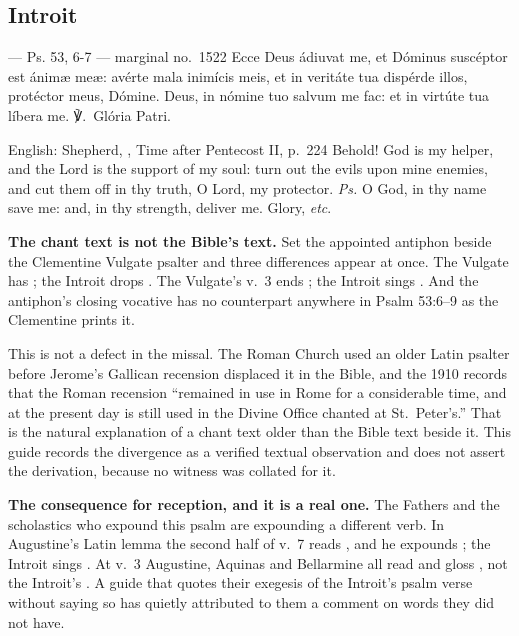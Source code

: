 \subsection*{Introit }

\begin{appointedlatin}{ --- Ps. 53, 6-7 --- marginal no.\ 1522}
Ecce Deus ádiuvat me, et Dóminus suscéptor est ánimæ meæ: avérte mala inimícis
meis, et in veritáte tua dispérde illos, protéctor meus, Dómine.  Deus, in nómine tuo salvum me fac: et in virtúte tua líbera me.
℣.~Glória Patri.
\end{appointedlatin}

\begin{namedtranslation}{English: Shepherd, , Time after Pentecost II, p.~224}
Behold! God is my helper, and the Lord is the support of my soul: turn out the
evils upon mine enemies, and cut them off in thy truth, O Lord, my protector.
\textit{Ps.} O God, in thy name save me: and, in thy strength, deliver me.
Glory, \textit{etc}.
\end{namedtranslation}

\textbf{The chant text is not the Bible's text.} Set the appointed antiphon
beside the Clementine Vulgate psalter and three differences appear at once.
The Vulgate has ; the Introit drops
. The Vulgate's v.~3 ends ;
the Introit sings . And the antiphon's closing vocative
 has no counterpart anywhere in Psalm 53:6--9
as the Clementine prints it.

This is not a defect in the missal. The Roman Church used an older Latin
psalter before Jerome's Gallican recension displaced it in the Bible, and the
1910  records that the Roman recension ``remained
in use in Rome for a considerable time, and at the present day is still used
in the Divine Office chanted at St.~Peter's.'' That is the natural
explanation of a chant text older than the Bible text beside it. This guide
records the divergence as a verified textual observation and does not assert
the derivation, because no  witness was collated for
it.

\textbf{The consequence for reception, and it is a real one.} The Fathers and
the scholastics who expound this psalm are expounding a different verb. In
Augustine's Latin lemma the second half of v.~7 reads , and he expounds ; the Introit sings
. At v.~3 Augustine, Aquinas and Bellarmine all read
and gloss , not the Introit's . A guide
that quotes their exegesis of the Introit's psalm verse without saying so has
quietly attributed to them a comment on words they did not have.

